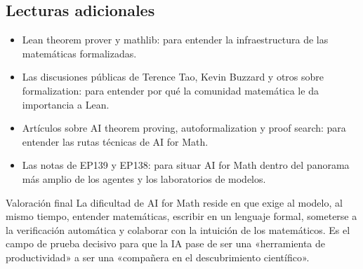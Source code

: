 \subsection{Lecturas adicionales}

\begin{itemize}
\item Lean theorem prover y mathlib: para entender la infraestructura de las matemáticas formalizadas.
\item Las discusiones públicas de Terence Tao, Kevin Buzzard y otros sobre formalization: para entender por qué la comunidad matemática le da importancia a Lean.
\item Artículos sobre AI theorem proving, autoformalization y proof search: para entender las rutas técnicas de AI for Math.
\item Las notas de EP139 y EP138: para situar AI for Math dentro del panorama más amplio de los agentes y los laboratorios de modelos.
\end{itemize}

\begin{importantbox}{Valoración final}
La dificultad de AI for Math reside en que exige al modelo, al mismo tiempo, entender matemáticas, escribir en un lenguaje formal, someterse a la verificación automática y colaborar con la intuición de los matemáticos. Es el campo de prueba decisivo para que la IA pase de ser una «herramienta de productividad» a ser una «compañera en el descubrimiento científico».
\end{importantbox}


